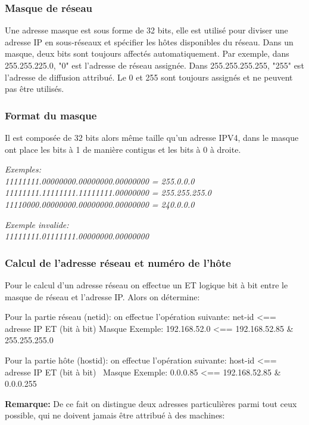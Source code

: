 \subsubsection{Masque de réseau}

Une adresse masque est sous forme de 32 bits, elle est utilisé pour diviser
une adresse IP en sous-réseaux et spécifier les hôtes disponibles du réseau.
Dans un masque, deux bits sont toujours affectés automatiquement. Par exemple,
dans 255.255.225.0, "0" est l'adresse de réseau assignée. Dans 255.255.255.255,
"255" est l'adresse de diffusion attribué. Le 0 et 255 sont toujours assignés
et ne peuvent pas être utilisés.


\subsubsection{Format du masque}
Il est composée de 32 bits alors même taille qu’un adresse IPV4, dans le masque
ont place les bits à 1 de manière contigus et les bits à 0 à droite.

\vspace{1cm}
{\it Exemples:\\
11111111.00000000.00000000.00000000 =   255.0.0.0\\
11111111.11111111.11111111.00000000 =   255.255.255.0\\
11110000.00000000.00000000.00000000 =   240.0.0.0 
}

\vspace{1cm}
{\it Exemple invalide:\\
11111111.01111111.00000000.00000000
}

\vspace{1cm}

\subsubsection{Calcul de l’adresse réseau et numéro de l’hôte}
Pour le calcul d’un adresse réseau on effectue un ET logique bit à bit
entre le masque de réseau et l’adresse IP. Alors on détermine:

Pour la partie réseau (netid): on effectue l’opération suivante:
    net-id <== adresse IP ET (bit à bit) Masque
Exemple: 192.168.52.0 <== 192.168.52.85 \& 255.255.255.0

Pour la partie hôte (hostid): on effectue l’opération suivante:
    host-id <== adresse IP ET (bit à bit) ~Masque
Exemple: 0.0.0.85 <== 192.168.52.85 \& 0.0.0.255

\textbf{Remarque:}
De ce fait on distingue deux adresses particulières parmi tout ceux possible,
qui ne doivent jamais être attribué à des machines:

